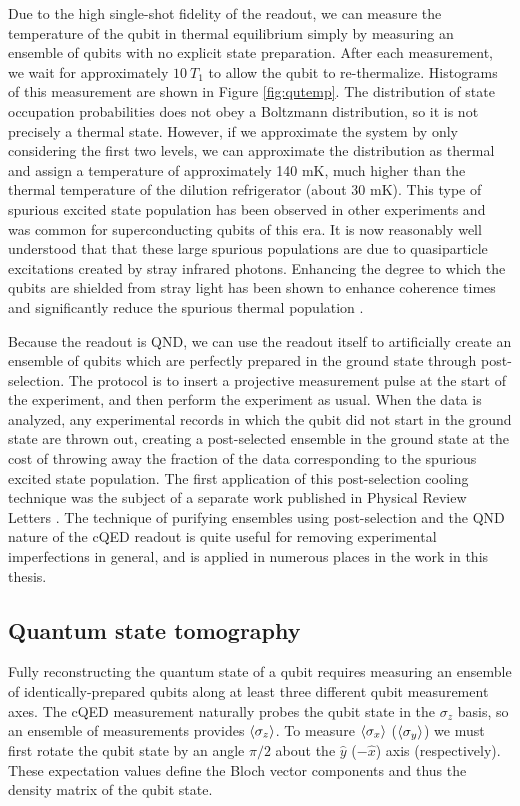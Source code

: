 Due to the high single-shot fidelity of the readout, we can measure the temperature of the qubit in thermal equilibrium simply by measuring an ensemble of qubits with no explicit state preparation.  After each measurement, we wait for approximately $10 \ T_1$ to allow the qubit to re-thermalize.  Histograms of this measurement are shown in Figure \ref{fig:qutemp}.  The distribution of state occupation probabilities does not obey a Boltzmann distribution, so it is not precisely a thermal state.  However, if we approximate the system by only considering the first two levels, we can approximate the distribution as thermal and assign a temperature of approximately 140 mK, much higher than the thermal temperature of the dilution refrigerator (about 30 mK).  This type of spurious excited state population has been observed in other experiments \cite{fluxqb,Geerlings2013,Jin2014} and was common for superconducting qubits of this era.  It is now reasonably well understood that that these large spurious populations are due to quasiparticle excitations created by stray infrared photons.  Enhancing the degree to which the qubits are shielded from stray light has been shown to enhance coherence times and significantly reduce the spurious thermal population \cite{Barends2011}.

Because the readout is QND, we can use the readout itself to artificially create an ensemble of qubits which are perfectly prepared in the ground state through post-selection.  The protocol is to insert a projective measurement pulse at the start of the experiment, and then perform the experiment as usual.  When the data is analyzed, any experimental records in which the qubit did not start in the ground state are thrown out, creating a post-selected ensemble in the ground state at the cost of throwing away the fraction of the data corresponding to the spurious excited state population.  The first application of this post-selection cooling technique was the subject of a separate work published in Physical Review Letters \cite{fluxqb}.  The technique of purifying ensembles using post-selection and the QND nature of the cQED readout is quite useful for removing experimental imperfections in general, and is applied in numerous places in the work in this thesis.

\subsection{Quantum state tomography}\label{s:qst_cal}

Fully reconstructing the quantum state of a qubit requires measuring an ensemble of identically-prepared qubits along at least three different qubit measurement axes.  The cQED measurement naturally probes the qubit state in the $\sigma_z$ basis, so an ensemble of measurements provides $\langle\sigma_z\rangle$.  To measure $\langle\sigma_x\rangle$ ($\langle\sigma_y\rangle$) we must first rotate the qubit state by an angle $\pi/2$ about the $\hat{y}$ ($-\hat{x}$) axis (respectively).  These expectation values define the Bloch vector components and thus the density matrix of the qubit state.

